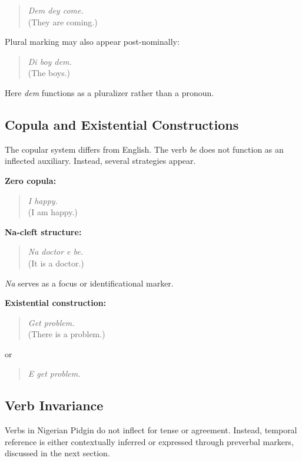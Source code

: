 \documentclass[12pt]{article}
\begin{document}
\begin{quote}
\textit{Dem dey come.} \\
(They are coming.)
\end{quote}

Plural marking may also appear post-nominally:

\begin{quote}
\textit{Di boy dem.} \\
(The boys.)
\end{quote}

Here \textit{dem} functions as a pluralizer rather than a pronoun.

\subsection{Copula and Existential Constructions}

The copular system differs from English. The verb \textit{be} does not function as an inflected auxiliary. Instead, several strategies appear.

\textbf{Zero copula:}

\begin{quote}
\textit{I happy.} \\
(I am happy.)
\end{quote}

\textbf{Na-cleft structure:}

\begin{quote}
\textit{Na doctor e be.} \\
(It is a doctor.)
\end{quote}

\textit{Na} serves as a focus or identificational marker.

\textbf{Existential construction:}

\begin{quote}
\textit{Get problem.} \\
(There is a problem.)
\end{quote}

or

\begin{quote}
\textit{E get problem.}
\end{quote}

\subsection{Verb Invariance}

Verbs in Nigerian Pidgin do not inflect for tense or agreement. Instead, temporal reference is either contextually inferred or expressed through preverbal markers, discussed in the next section.
\end{document}
